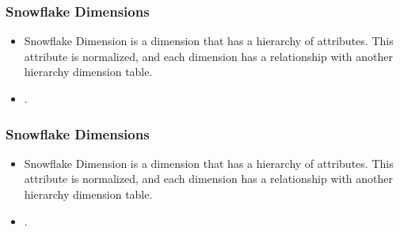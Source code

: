\VideoClassification[column=1, colour=blue]
\begin{frame}
    \frametitle{Snowflake Dimensions}
    \begin{itemize}[<+->]
        \item Snowflake Dimension is a dimension that has a hierarchy of attributes. This attribute is normalized, and each dimension has a relationship with another hierarchy dimension table.\\
        \item {}.
    \end{itemize}
\end{frame}
\begin{frame}
    \frametitle{Snowflake Dimensions}
    \begin{itemize}
        \item Snowflake Dimension is a dimension that has a hierarchy of attributes. This attribute is normalized, and each dimension has a relationship with another hierarchy dimension table.\\
		\item {}.
    \end{itemize}
    \centering
    
\end{frame}



